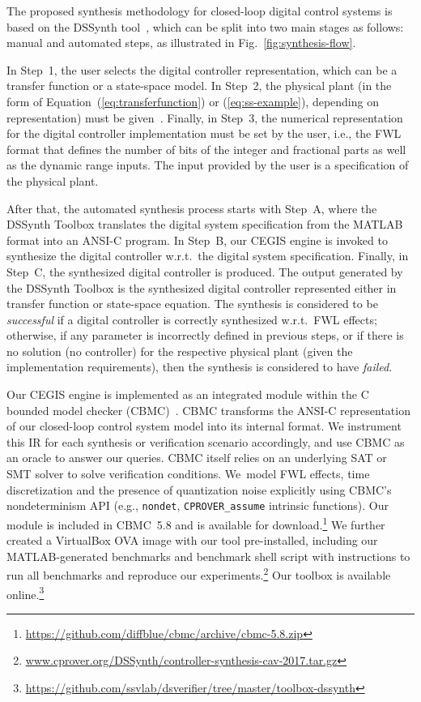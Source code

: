 \documentclass[conference]{IEEEtran}
\newcommand\tool{{DSSynth Toolbox}\xspace}
\begin{document}
The proposed synthesis methodology for closed-loop digital control
systems is based on the DSSynth tool~\cite{abate2017, abatecav2017}, 
which can be split into two main stages as follows: manual and 
automated steps, as illustrated in Fig.~\ref{fig:synthesis-flow}. 

In Step~1, the user selects the digital controller representation, which
can be a transfer function or a state-space model.  In Step~2, the
physical plant (in the form of Equation~(\ref{eq:transferfunction}) or
(\ref{eq:ss-example}), depending on representation) must be
given~\cite{astrom1997computer}.  Finally, in Step~3, the numerical
representation for the digital controller implementation must be set by the
user, i.e., the FWL format that defines the number of bits of the integer
and fractional parts as well as the dynamic range inputs.  The input 
provided by the user is a specification of the physical plant.

After that, the automated synthesis process starts with Step~A, where the
\tool translates the digital system specification from the MATLAB format
into an ANSI-C program.  In Step~B, our CEGIS engine is invoked to
synthesize the digital controller w.r.t.~the digital system specification. 
Finally, in Step~C, the synthesized digital controller is produced.  The
output generated by the \tool is the synthesized digital controller
represented either in transfer function or state-space equation.  The
synthesis is considered to be \emph{successful} if a digital controller is
correctly synthesized w.r.t.~FWL effects; otherwise, if any parameter is
incorrectly defined in previous steps, or if there is no solution (no
controller) for the respective physical plant (given the implementation
requirements), then the synthesis is considered to have \emph{failed}.

Our CEGIS engine is implemented as an integrated module within the C bounded
model checker (CBMC)~\cite{cbmc}.  CBMC transforms the ANSI-C representation
of our closed-loop control system model into its internal format.  We
instrument this IR for each synthesis or verification scenario accordingly,
and use CBMC as an oracle to answer our queries.  CBMC itself relies on an
underlying SAT or SMT solver to solve verification conditions.  We~model FWL
effects, time discretization and the presence of quantization noise
explicitly using CBMC's nondeterminism API (e.g., \texttt{nondet},
\texttt{CPROVER\_assume} intrinsic functions).  Our module is included in
CBMC~5.8 and is available for
download.\footnote{\url{https://github.com/diffblue/cbmc/archive/cbmc-5.8.zip}}
We further created a VirtualBox OVA image with our tool pre-installed,
including our MATLAB-generated benchmarks and benchmark shell script with
instructions to run all benchmarks and reproduce our
experiments.\footnote{\url{www.cprover.org/DSSynth/controller-synthesis-cav-2017.tar.gz}}
Our toolbox is available
online.\footnote{\url{https://github.com/ssvlab/dsverifier/tree/master/toolbox-dssynth}}
\end{document}

